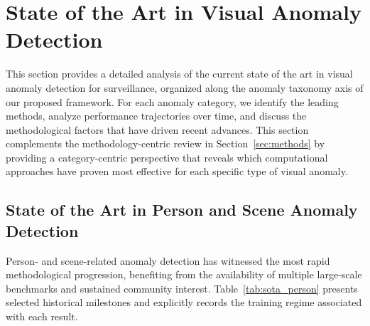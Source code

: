 \documentclass[10pt,a4paper]{article}
\begin{document}
\section{State of the Art in Visual Anomaly Detection}
\label{sec:sota}

This section provides a detailed analysis of the current state of the art in visual anomaly detection for surveillance, organized along the anomaly taxonomy axis of our proposed framework. For each anomaly category, we identify the leading methods, analyze performance trajectories over time, and discuss the methodological factors that have driven recent advances. This section complements the methodology-centric review in Section~\ref{sec:methods} by providing a category-centric perspective that reveals which computational approaches have proven most effective for each specific type of visual anomaly.


\subsection{State of the Art in Person and Scene Anomaly Detection}
\label{subsec:sota_person}

Person- and scene-related anomaly detection has witnessed the most rapid methodological progression, benefiting from the availability of multiple large-scale benchmarks and sustained community interest. Table~\ref{tab:sota_person} presents selected historical milestones and explicitly records the training regime associated with each result.
\end{document}
